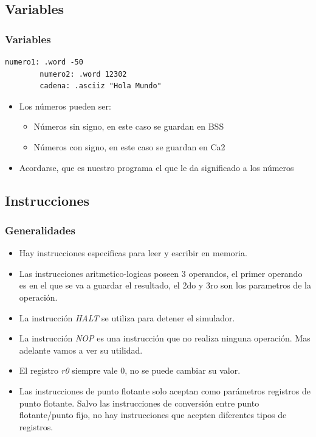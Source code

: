 \documentclass{beamer}
\begin{document}
\subsection{Variables}
\begin{frame}[fragile]
\frametitle{Variables}
\begin{block}{}
\begin{lstlisting}[language=WinMIPS64,basicstyle=\ttfamily,keywordstyle=\color{blue}]
        numero1: .word -50
        numero2: .word 12302
        cadena: .asciiz "Hola Mundo"
\end{lstlisting}
\end{block}
\begin{itemize}
\item Los números pueden ser:
\begin{itemize}
\item Números sin signo, en este caso se guardan en BSS
\item Números con signo, en este caso se guardan en Ca2
\end{itemize}
\item Acordarse, que es nuestro programa el que le da significado a los números
\end{itemize}
\end{frame}

\subsection{Instrucciones}

\begin{frame}
\frametitle{Generalidades}
\begin{itemize}
\item Hay instrucciones especificas para leer y escribir en memoria.
\item Las instrucciones aritmetico-logicas poseen 3 operandos, el primer operando es en el que se va a guardar el resultado, el 2do y 3ro son los parametros de la operación.
\item La instrucción \emph{HALT} se utiliza para detener el simulador.
\item La instrucción \emph{NOP} es una instrucción que no realiza ninguna operación. Mas adelante vamos a ver su utilidad.
\item El registro \emph{r0} siempre vale 0, no se puede cambiar su valor.
\item Las instrucciones de punto flotante solo aceptan como parámetros registros de punto flotante. Salvo las instrucciones de conversión entre punto flotante/punto fijo, no hay instrucciones que acepten diferentes tipos de registros.
\end{itemize}
\end{frame}
\end{document}
